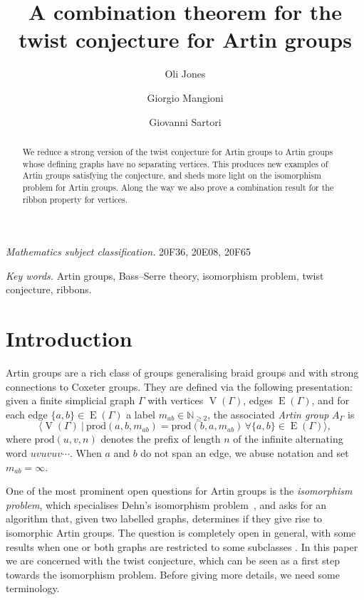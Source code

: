 \documentclass[svgnames]{amsart}
\title[A combination theorem for the twist conjecture for Artin groups]{A combination theorem for the twist conjecture for Artin groups}
\author[O. Jones]{Oli Jones}
\author[G. Mangioni]{Giorgio Mangioni}
\author[G. Sartori]{Giovanni Sartori}
\theoremstyle{plain}
\theoremstyle{definition}
\newcommand{\edge}[1]{\operatorname{E}(#1)}
\newcommand{\ver}[1]{\operatorname{V}(#1)}
\begin{document}
\begin{abstract}
    We reduce a strong version of the twist conjecture for Artin groups to Artin groups whose defining graphs have no separating vertices. This produces new examples of Artin groups satisfying the conjecture, and sheds more light on the isomorphism problem for Artin groups. Along the way we also prove a combination result for the ribbon property for vertices.
\end{abstract}

\maketitle


\small

 \textit{Mathematics subject classification.} 20F36, 20E08, 20F65

\noindent \textit{Key words.} Artin groups, Bass--Serre theory, isomorphism problem, twist conjecture, ribbons.

\normalsize

\section*{Introduction}
Artin groups are a rich class of groups generalising braid groups and with strong connections to Coxeter groups. They are defined via the following presentation: given a finite simplicial graph $\Gamma$ with vertices $\ver\Gamma$, edges $\edge\Gamma$, and for each edge $\{a,b\} \in \edge{\Gamma}$ a label $m_{ab} \in \mathbb{N}_{\geq2}$, the associated \emph{Artin group} $A_\Gamma$ is 
$$\langle \ver{\Gamma} \ | \ \mathrm{prod}(a,b,m_{ab})=\mathrm{prod}(b,a,m_{ab}) \, \forall \{a,b\}\in \edge{\Gamma}\rangle,$$
where $\mathrm{prod}(u,v,n)$ denotes the prefix of length $n$ of the infinite alternating word $uvuvuv\cdots$. When $a$ and $b$ do not span an edge, we abuse notation and set $m_{ab}=\infty$. 

One of the most prominent open questions for Artin groups is the \emph{isomorphism problem}, which specialises Dehn's isomorphism problem~\cite{Dehn_isoprob}, and asks for an algorithm that, given two labelled graphs, determines if they give rise to isomorphic Artin groups. The question is completely open in general, with some results when one or both graphs are restricted to some subclasses {\cite{baudisch1981raagcharacterise,droms1987isomorphisms,Paris_isoprob_spherical,vaskou_isoproblem}}. In this paper we are concerned with the twist conjecture, which can be seen as a first step towards the isomorphism problem. Before giving more details, we need some terminology.
\end{document}
